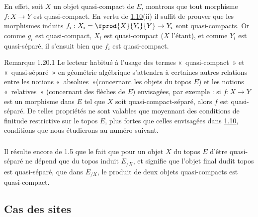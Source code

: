 En effet, soit $X$ un objet quasi-compact de $E$, montrons que tout
morphisme $f : X \to Y$ est quasi-compact. En vertu de \hyperref[VI.prop1.10]{1.10}(ii) il
suffit de prouver que les morphismes induits $f_i : X_i =
\fprod{X}{Y_i}{Y} \to Y_i$ sont quasi-compacts. Or comme $g_i$ est
quasi-compact, $X_i$ est quasi-compact ($X$ l'étant), et comme $Y_i$
est quasi-séparé, il s'ensuit bien que $f_i$ est quasi-compact.

\begin{enonce*}[remark]{Remarque 1.20.1}
Le lecteur habitué à l'usage des termes « quasi-compact » et « quasi-séparé » en géométrie algébrique s'attendra à certaines
autres relations entre les notions « absolues »(concernant les
objets du topos $E$) et les notions « relatives » (concernant
des flèches de $E$) envisagées, par exemple : si $f: X \to Y$ est un
morphisme dans $E$ tel que $X$ soit quasi-compact-séparé, alors $f$
est quasi-séparé. De telles propriétés ne sont valables que
moyennant des conditions de finitude restrictive sur le topos $E$,
plus fortes que celles envisagées dans \hyperref[VI.prop1.10]{1.10}, conditions
que nous étudierons au numéro suivant.
\end{enonce*}

\setcounter{subsection}{20}
\setcounter{subsubsection}{1}
\subsubsection{}
Il résulte encore de 1.5 que le fait que pour un objet $X$ du topos
$E$ d'être quasi-séparé ne dépend que du topos induit $E_{/X}$, et
signifie que l'objet final dudit topos est quasi-séparé, \ie que
dans $E_{/X}$, le produit de deux objets quasi-compacts est
quasi-compact.

\subsection{Cas des sites}\pageoriginale

